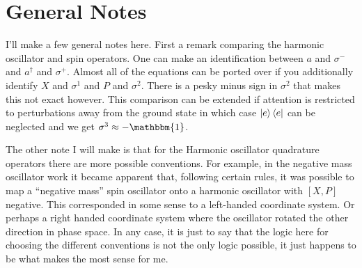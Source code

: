\documentclass[12pt]{article}
\begin{document}
\section{General Notes}
I'll make a few general notes here. First a remark comparing the harmonic oscillator and spin operators. One can make an identification between $a$ and $\sigma^-$ and $a^{\dag}$ and $\sigma^+$. Almost all of the equations can be ported over if you additionally identify $X$ and $\sigma^1$ and $P$ and $\sigma^2$. There is a pesky minus sign in $\sigma^2$ that makes this not exact however. This comparison can be extended if attention is restricted to perturbations away from the ground state in which case $\ket{e}\bra{e}$ can be neglected and we get $\sigma^3 \approx - \mathbbm{1}$.

The other note I will make is that for the Harmonic oscillator quadrature operators there are more possible conventions. For example, in the negative mass oscillator work it became apparent that, following certain rules, it was possible to map a ``negative mass'' spin oscillator onto a harmonic oscillator with $[X,P]$ negative. This corresponded in some sense to a left-handed coordinate system. Or perhaps a right handed coordinate system where the oscillator rotated the other direction in phase space. In any case, it is just to say that the logic here for choosing the different conventions is not the only logic possible, it just happens to be what makes the most sense for me.
\end{document}
